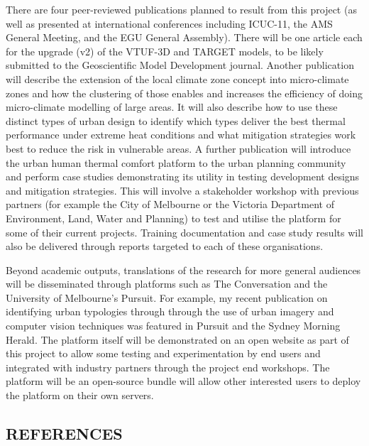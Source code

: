 There are four peer-reviewed publications planned to result from this project (as well as presented at international conferences including ICUC-11, the AMS General Meeting, and the EGU General Assembly). There will be one article each for the upgrade (v2) of the VTUF-3D and TARGET models, to be likely submitted to the Geoscientific Model Development journal. Another publication will describe the extension of the local climate zone concept into micro-climate zones and how the clustering of those enables and increases the efficiency of doing micro-climate modelling of large areas. It will also describe how to use these distinct types of urban design to identify which types deliver the best thermal performance under extreme heat conditions and what mitigation strategies work best to reduce the risk in vulnerable areas. A further publication will introduce the urban human thermal comfort platform to the urban planning community and perform case studies demonstrating its utility in testing development designs and mitigation strategies. This will involve a stakeholder workshop with previous partners (for example the City of Melbourne or the Victoria Department of Environment, Land, Water and Planning) to test and utilise the platform for some of their current projects. Training documentation and case study results will also be delivered through reports targeted to each of these organisations. 


Beyond academic outputs, translations of the research for more general audiences will be disseminated through platforms such as The Conversation and the University of Melbourne's Pursuit. For example, my recent publication on identifying urban typologies through through the use of urban imagery and computer vision techniques was featured in Pursuit\cite{Nice2020c} and the Sydney Morning Herald\cite{Gladstone2018a}. The platform itself will be demonstrated on an open website as part of this project to allow some testing and experimentation by end users and integrated with industry partners through the project end workshops. The platform will be an open-source bundle will allow other interested users to deploy the platform on their own servers.  




\subsection*{\TitleFont REFERENCES}
\renewcommand{\refname}{\normalfont\selectfont\TitleFont REFERENCES} 
\begingroup
\fontsize{10pt}{10pt}\selectfont













%
